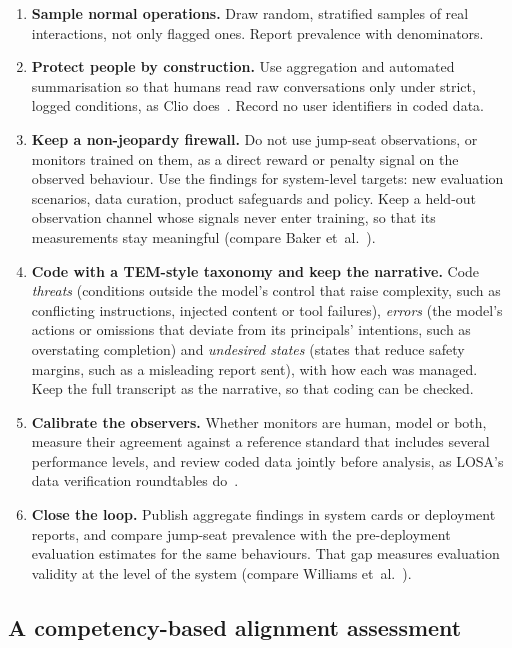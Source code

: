 \documentclass[11pt]{article}
\begin{document}
\begin{enumerate}
  \item \textbf{Sample normal operations.} Draw random, stratified samples of real interactions, not only flagged ones. Report prevalence with denominators.
  \item \textbf{Protect people by construction.} Use aggregation and automated summarisation so that humans read raw conversations only under strict, logged conditions, as Clio does~\cite{tamkin2024}. Record no user identifiers in coded data.
  \item \textbf{Keep a non-jeopardy firewall.} Do not use jump-seat observations, or monitors trained on them, as a direct reward or penalty signal on the observed behaviour. Use the findings for system-level targets: new evaluation scenarios, data curation, product safeguards and policy. Keep a held-out observation channel whose signals never enter training, so that its measurements stay meaningful (compare Baker et~al.~\cite{baker2025}).
  \item \textbf{Code with a TEM-style taxonomy and keep the narrative.} Code \emph{threats} (conditions outside the model's control that raise complexity, such as conflicting instructions, injected content or tool failures), \emph{errors} (the model's actions or omissions that deviate from its principals' intentions, such as overstating completion) and \emph{undesired states} (states that reduce safety margins, such as a misleading report sent), with how each was managed. Keep the full transcript as the narrative, so that coding can be checked.
  \item \textbf{Calibrate the observers.} Whether monitors are human, model or both, measure their agreement against a reference standard that includes several performance levels, and review coded data jointly before analysis, as LOSA's data verification roundtables do~\cite[para.~10b(8)]{faa2006losa}.
  \item \textbf{Close the loop.} Publish aggregate findings in system cards or deployment reports, and compare jump-seat prevalence with the pre-deployment evaluation estimates for the same behaviours. That gap measures evaluation validity at the level of the system (compare Williams et~al.~\cite{williams2026}).
\end{enumerate}

\subsection{A competency-based alignment assessment}\label{sec:cbaa}
\end{document}
